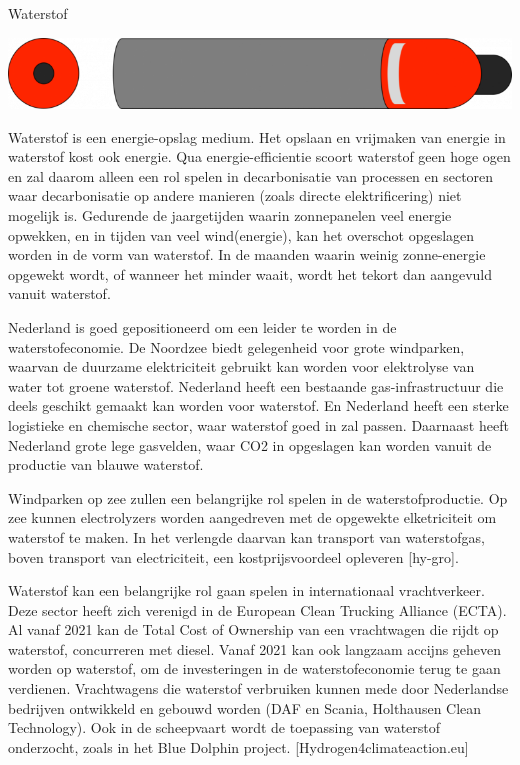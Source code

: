\begin{voorstel}{Waterstof}
\begin{multicols*}{2}
\begin{overwegingen}
\includegraphics[width=.5\textwidth]{img/energie/waterstof-tank}

Waterstof is een energie-opslag medium. Het opslaan en vrijmaken van energie in waterstof kost ook energie. Qua energie-efficientie scoort waterstof geen hoge ogen en zal daarom alleen een rol spelen in decarbonisatie van processen en sectoren waar decarbonisatie op andere manieren (zoals directe elektrificering) niet mogelijk is. Gedurende de jaargetijden waarin zonnepanelen veel energie opwekken, en in tijden van veel wind(energie), kan het overschot opgeslagen worden in de vorm van waterstof. In de maanden waarin weinig zonne-energie opgewekt wordt, of wanneer het minder waait, wordt het tekort dan aangevuld vanuit waterstof.

Nederland is goed gepositioneerd om een leider te worden in de waterstofeconomie. De Noordzee biedt gelegenheid voor grote windparken, waarvan de duurzame elektriciteit gebruikt kan worden voor elektrolyse van water tot groene waterstof. Nederland heeft een bestaande gas-infrastructuur die deels geschikt gemaakt kan worden voor waterstof. En Nederland heeft een sterke logistieke en chemische sector, waar waterstof goed in zal passen. Daarnaast heeft Nederland grote lege gasvelden, waar CO2 in opgeslagen kan worden vanuit de productie van blauwe waterstof.

Windparken op zee zullen een belangrijke rol spelen in de waterstofproductie. Op zee kunnen electrolyzers worden aangedreven met de opgewekte elketriciteit om waterstof te maken. In het verlengde daarvan kan transport van waterstofgas, boven transport van electriciteit, een kostprijsvoordeel opleveren [hy-gro].

Waterstof kan een belangrijke rol gaan spelen in internationaal vrachtverkeer. Deze sector heeft zich verenigd in de European Clean Trucking Alliance (ECTA). Al vanaf 2021 kan de Total Cost of Ownership van een vrachtwagen die rijdt op waterstof, concurreren met diesel. Vanaf 2021 kan ook langzaam accijns geheven worden op waterstof, om de investeringen in de waterstofeconomie terug te gaan verdienen. Vrachtwagens die waterstof verbruiken kunnen mede door Nederlandse bedrijven ontwikkeld en gebouwd worden (DAF en Scania, Holthausen Clean Technology). Ook in de scheepvaart wordt de toepassing van waterstof onderzocht, zoals in het Blue Dolphin project. [Hydrogen4climateaction.eu]


\end{overwegingen}
\end{multicols*}
\end{voorstel}
